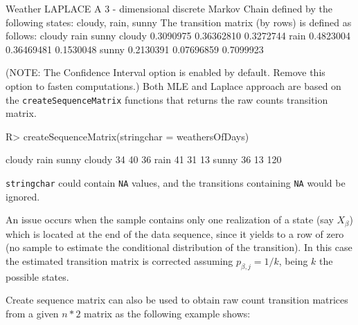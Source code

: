 \documentclass[
  nojss]{jss}
\begin{document}
\begin{CodeChunk}


\begin{CodeOutput}
Weather LAPLACE 
 A  3 - dimensional discrete Markov Chain defined by the following states: 
 cloudy, rain, sunny 
 The transition matrix  (by rows)  is defined as follows: 
          cloudy       rain     sunny
cloudy 0.3090975 0.36362810 0.3272744
rain   0.4823004 0.36469481 0.1530048
sunny  0.2130391 0.07696859 0.7099923
\end{CodeOutput}
\end{CodeChunk}

(NOTE: The Confidence Interval option is enabled by default. Remove this option to fasten computations.) Both MLE and Laplace approach are based on the \texttt{createSequenceMatrix} functions that returns the raw counts transition matrix.

\begin{CodeChunk}

\begin{CodeInput}
R> createSequenceMatrix(stringchar = weathersOfDays)
\end{CodeInput}

\begin{CodeOutput}
       cloudy rain sunny
cloudy     34   40    36
rain       41   31    13
sunny      36   13   120
\end{CodeOutput}
\end{CodeChunk}

\texttt{stringchar} could contain \texttt{NA} values, and the transitions containing \texttt{NA} would be ignored.

An issue occurs when the sample contains only one realization of a state (say \(X_{\beta}\)) which is located at the end of the data sequence, since it yields to a row of zero (no sample to estimate the conditional distribution of the transition). In this case the estimated transition matrix is corrected assuming \(p_{\beta,j}=1/k\), being \(k\) the possible states.

Create sequence matrix can also be used to obtain raw count transition matrices from a given \(n*2\) matrix as the following example shows:
\end{document}
